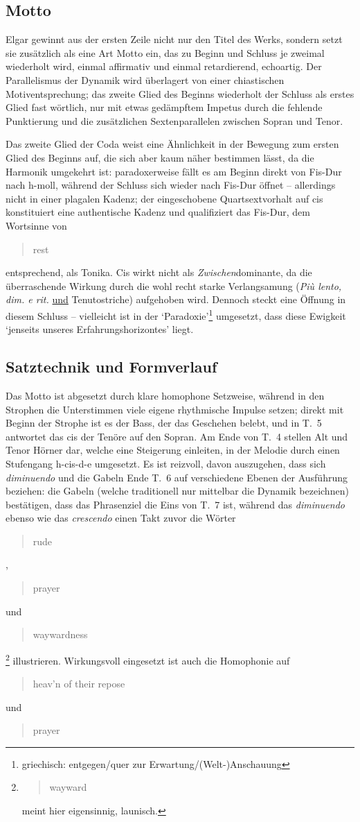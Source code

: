 \documentclass[a4paper,11pt,open=any]{scrbook}
\newcommand{\engquote}[1]{\foreignblockquote{english}{#1}}
\begin{document}
\subsection*{Motto}
Elgar gewinnt aus der ersten Zeile nicht nur den Titel des Werks, sondern
setzt sie zusätzlich als eine Art Motto ein, das zu Beginn und Schluss je
zweimal wiederholt wird, einmal affirmativ und einmal retardierend,
echoartig.  Der Parallelismus der Dynamik wird überlagert von einer
chiastischen Motiventsprechung; das zweite Glied des Beginns wiederholt
der Schluss als erstes Glied fast wörtlich, nur mit etwas gedämpftem
Impetus durch die fehlende Punktierung und die zusätzlichen Sextenparallelen
zwischen Sopran und Tenor.

Das zweite Glied der Coda weist eine Ähnlichkeit in der Bewegung zum
ersten Glied des Beginns auf, die sich aber kaum näher bestimmen lässt,
da die Harmonik umgekehrt ist: paradoxerweise fällt es am Beginn direkt
von Fis-Dur nach h-moll, während der Schluss sich wieder nach Fis-Dur
öffnet – allerdings nicht in einer plagalen Kadenz; der eingeschobene
Quartsextvorhalt auf \textsf{cis} konstituiert eine authentische
Kadenz und qualifiziert das Fis-Dur, dem Wortsinne von \engquote{rest}
entsprechend, als Tonika.  \textsf{Cis} wirkt nicht als
\textit{Zwischen}dominante, da die überraschende Wirkung durch
die wohl recht starke Verlangsamung (\textit{Più lento, dim. e
rit.} \underline{und} Tenutostriche) aufgehoben wird.  Dennoch
steckt eine Öffnung in diesem Schluss – vielleicht ist in der
\enquote*{Paradoxie}\footnote{griechisch: entgegen/quer zur
Erwartung/(Welt-)Anschauung} umgesetzt, dass diese Ewigkeit
\enquote*{jenseits unseres Erfahrungshorizontes} liegt.

\subsection*{Satztechnik und Formverlauf}
Das Motto ist abgesetzt durch klare homophone Setzweise, während in den
Strophen die Unterstimmen viele eigene rhythmische Impulse setzen; direkt
mit Beginn der Strophe ist es der Bass, der das Geschehen belebt, und in
T.~5 antwortet das \textsf{cis} der Tenöre auf den Sopran.  Am Ende von
T.~4 stellen Alt und Tenor Hörner dar, welche eine Steigerung einleiten,
in der Melodie durch einen Stufengang \mbox{\textsf{h-cis-d-e}} umgesetzt.
Es ist reizvoll, davon auszugehen, dass sich \textit{diminuendo} und die
Gabeln Ende T.~6 auf verschiedene Ebenen der Ausführung beziehen: die
Gabeln (welche traditionell nur mittelbar die Dynamik bezeichnen\cite
[Kapitel 1]{poli}) bestätigen, dass das Phrasenziel die Eins von T.~7
ist, während das \textit{diminuendo} ebenso wie das \textit{crescendo}
einen Takt zuvor die Wörter \engquote{rude}, \engquote{prayer} und
\engquote{waywardness}\footnote{\engquote{wayward} meint hier eigensinnig,
launisch.} illustrieren.  Wirkungsvoll eingesetzt ist auch die Homophonie
auf \engquote{heav’n of their repose} und \engquote{prayer}.
\end{document}
